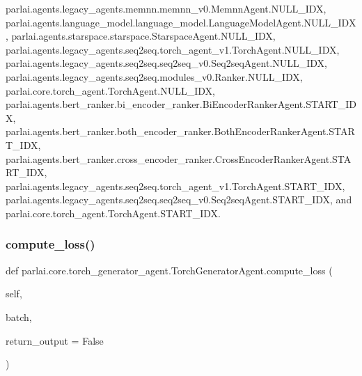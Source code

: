 parlai.\+agents.\+legacy\+\_\+agents.\+memnn.\+memnn\+\_\+v0.\+Memnn\+Agent.\+N\+U\+L\+L\+\_\+\+I\+DX, parlai.\+agents.\+language\+\_\+model.\+language\+\_\+model.\+Language\+Model\+Agent.\+N\+U\+L\+L\+\_\+\+I\+DX, parlai.\+agents.\+starspace.\+starspace.\+Starspace\+Agent.\+N\+U\+L\+L\+\_\+\+I\+DX, parlai.\+agents.\+legacy\+\_\+agents.\+seq2seq.\+torch\+\_\+agent\+\_\+v1.\+Torch\+Agent.\+N\+U\+L\+L\+\_\+\+I\+DX, parlai.\+agents.\+legacy\+\_\+agents.\+seq2seq.\+seq2seq\+\_\+v0.\+Seq2seq\+Agent.\+N\+U\+L\+L\+\_\+\+I\+DX, parlai.\+agents.\+legacy\+\_\+agents.\+seq2seq.\+modules\+\_\+v0.\+Ranker.\+N\+U\+L\+L\+\_\+\+I\+DX, parlai.\+core.\+torch\+\_\+agent.\+Torch\+Agent.\+N\+U\+L\+L\+\_\+\+I\+DX, parlai.\+agents.\+bert\+\_\+ranker.\+bi\+\_\+encoder\+\_\+ranker.\+Bi\+Encoder\+Ranker\+Agent.\+S\+T\+A\+R\+T\+\_\+\+I\+DX, parlai.\+agents.\+bert\+\_\+ranker.\+both\+\_\+encoder\+\_\+ranker.\+Both\+Encoder\+Ranker\+Agent.\+S\+T\+A\+R\+T\+\_\+\+I\+DX, parlai.\+agents.\+bert\+\_\+ranker.\+cross\+\_\+encoder\+\_\+ranker.\+Cross\+Encoder\+Ranker\+Agent.\+S\+T\+A\+R\+T\+\_\+\+I\+DX, parlai.\+agents.\+legacy\+\_\+agents.\+seq2seq.\+torch\+\_\+agent\+\_\+v1.\+Torch\+Agent.\+S\+T\+A\+R\+T\+\_\+\+I\+DX, parlai.\+agents.\+legacy\+\_\+agents.\+seq2seq.\+seq2seq\+\_\+v0.\+Seq2seq\+Agent.\+S\+T\+A\+R\+T\+\_\+\+I\+DX, and parlai.\+core.\+torch\+\_\+agent.\+Torch\+Agent.\+S\+T\+A\+R\+T\+\_\+\+I\+DX.

\mbox{\label{classparlai_1_1core_1_1torch__generator__agent_1_1TorchGeneratorAgent_a94808a13bba0d5283613acd98516bd3c}} 
\subsubsection{\texorpdfstring{compute\+\_\+loss()}{compute\_loss()}}
{\footnotesize\ttfamily def parlai.\+core.\+torch\+\_\+generator\+\_\+agent.\+Torch\+Generator\+Agent.\+compute\+\_\+loss (\begin{DoxyParamCaption}\item[{}]{self,  }\item[{}]{batch,  }\item[{}]{return\+\_\+output = {\ttfamily False} }\end{DoxyParamCaption})}

